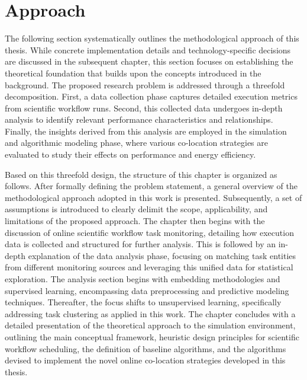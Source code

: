 \section{Approach}
\label{cha:approach}
The following section systematically outlines the methodological approach of this thesis. While concrete implementation details and technology-specific decisions are discussed in the subsequent chapter, this section focuses on establishing the theoretical foundation that builds upon the concepts introduced in the background. The proposed research problem is addressed through a threefold decomposition. First, a data collection phase captures detailed execution metrics from scientific workflow runs. Second, this collected data undergoes in-depth analysis to identify relevant performance characteristics and relationships. Finally, the insights derived from this analysis are employed in the simulation and algorithmic modeling phase, where various co-location strategies are evaluated to study their effects on performance and energy efficiency.

Based on this threefold design, the structure of this chapter is organized as follows. After formally defining the problem statement, a general overview of the methodological approach adopted in this work is presented. Subsequently, a set of assumptions is introduced to clearly delimit the scope, applicability, and limitations of the proposed approach. The chapter then begins with the discussion of online scientific workflow task monitoring, detailing how execution data is collected and structured for further analysis. This is followed by an in-depth explanation of the data analysis phase, focusing on matching task entities from different monitoring sources and leveraging this unified data for statistical exploration. The analysis section begins with embedding methodologies and supervised learning, encompassing data preprocessing and predictive modeling techniques. Thereafter, the focus shifts to unsupervised learning, specifically addressing task clustering as applied in this work. The chapter concludes with a detailed presentation of the theoretical approach to the simulation environment, outlining the main conceptual framework, heuristic design principles for scientific workflow scheduling, the definition of baseline algorithms, and the algorithms devised to implement the novel online co-location strategies developed in this thesis.

